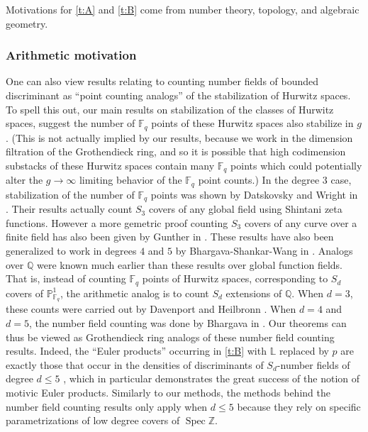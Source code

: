 \documentclass[12 pt]{amsart}
\theoremstyle{plain}
\theoremstyle{definition}
\theoremstyle{remark}
\numberwithin{equation}{section}
\newcommand\bp{\mathbb P}
\newcommand\bq{\mathbb Q}
\newcommand{\Z}{\mathbb Z}
\newcommand{\Spec}{\operatorname{Spec}}
\begin{document}
Motivations for \autoref{t:A} and \autoref{t:B} come from 
 number theory, topology, and algebraic geometry.


\subsubsection{Arithmetic motivation}
One can also view results relating to counting
number fields of bounded discriminant as ``point counting analogs''
of the stabilization of Hurwitz spaces.
To spell this out, our main results on stabilization of the classes of Hurwitz
spaces, suggest the number of $\mathbb F_q$ points of these Hurwitz spaces
also stabilize in $g$. (This is not actually implied by our results, because we
work in the dimension filtration of the Grothendieck ring, and so it is possible that high codimension
substacks of these Hurwitz spaces contain many $\mathbb F_q$ points which
could potentially alter the $g \to \infty$ limiting behavior of the $\mathbb
F_q$ point counts.)
In the degree $3$ case, stabilization of the number of $\mathbb F_q$
points was  shown by Datskovsky and Wright in
\cite{Datskovsky1988}.
Their results actually count $S_3$ covers of any global field using Shintani zeta functions. 
However a more gemetric proof counting $S_3$ covers of any curve over a finite field has also been
given by Gunther in \cite{guntherCOUNTINGCUBICCURVE}.
These results have also been generalized to work in degrees $4$ and $5$
by Bhargava-Shankar-Wang in \cite{bhargavaSW:geometry-of-numbers-over-global-fields-i}.
Analogs over $\bq$
were known much earlier than  these results over global function fields.
That is, instead of counting $\mathbb F_q$ points of Hurwitz spaces, corresponding to
$S_d$ covers of $\bp^1_{\mathbb F_q}$, the arithmetic analog is to count
$S_d$ extensions of $\mathbb Q$.
When $d = 3$, these counts were carried out by 
Davenport and Heilbronn \cite{Davenport1969, Davenport1971}.
When $d =4$ and $d = 5$, the number field counting was done by Bhargava in
\cite{Bhargava2005,Bhargava2010a,bhargava:the-geometric-sieve}.  Our 
theorems can thus be viewed as Grothendieck ring analogs of these number field counting results.
Indeed, the ``Euler products'' occurring in \autoref{t:B} with $\mathbb{L}$ replaced by $p$
are exactly those that occur in the densities of discriminants of $S_d$-number fields of
degree $d\leq 5$ 
\cite{Davenport1969,Bhargava2005,Bhargava2010a}, which in particular demonstrates the great success of the notion of motivic Euler products.
Similarly to our methods, the methods behind the number field counting results only apply when $d\leq
5$ because they rely on specific
parametrizations  \cite{Delone1964,Bhargava2004b, Bhargava2008a} of low degree covers of $\Spec \Z$.
\end{document}
